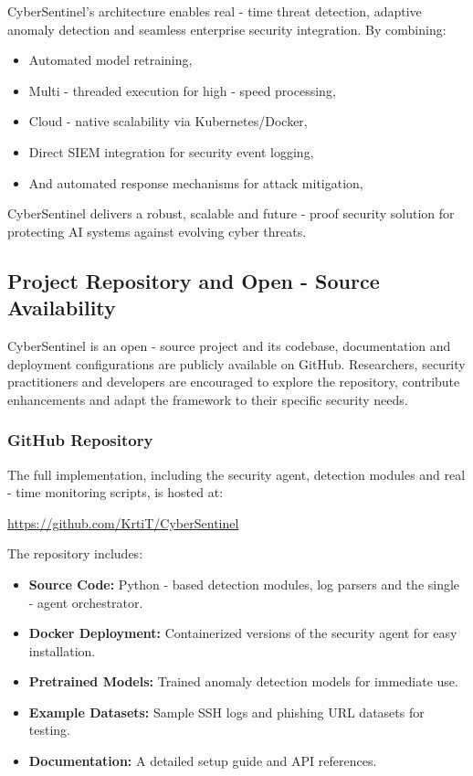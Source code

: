 \documentclass{article}
\begin{document}
CyberSentinel’s architecture enables real - time threat detection, adaptive anomaly detection and seamless enterprise security integration. By combining:
\begin{itemize}
    \item Automated model retraining,
    \item Multi - threaded execution for high - speed processing,
    \item Cloud - native scalability via Kubernetes/Docker,
    \item Direct SIEM integration for security event logging,
    \item And automated response mechanisms for attack mitigation,
\end{itemize}
CyberSentinel delivers a robust, scalable and future - proof security solution for protecting AI systems against evolving cyber threats.

\subsection{Project Repository and Open - Source Availability}

CyberSentinel is an open - source project and its codebase, documentation and deployment configurations are publicly available on GitHub. Researchers, security practitioners and developers are encouraged to explore the repository, contribute enhancements and adapt the framework to their specific security needs.

\subsubsection{GitHub Repository}

The full implementation, including the security agent, detection modules and real - time monitoring scripts, is hosted at:
\begin{center}
    \url{https://github.com/KrtiT/CyberSentinel}
\end{center}

The repository includes:
\begin{itemize}
    \item \textbf{Source Code:} Python - based detection modules, log parsers and the single - agent orchestrator.
    \item \textbf{Docker Deployment:} Containerized versions of the security agent for easy installation.
    \item \textbf{Pretrained Models:} Trained anomaly detection models for immediate use.
    \item \textbf{Example Datasets:} Sample SSH logs and phishing URL datasets for testing.
    \item \textbf{Documentation:} A detailed setup guide and API references.
\end{itemize}
\end{document}
